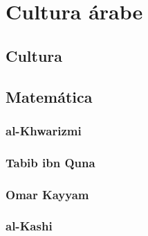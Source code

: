 \documentclass[a4paper,12pt,openany]{article}
\begin{document}
\section*{Cultura árabe}
\subsection*{Cultura}


\subsection*{Matemática}


\subsubsection*{al-Khwarizmi}


\subsubsection*{Tabib ibn Quna}


\subsubsection*{Omar Kayyam}


\subsubsection*{al-Kashi}

\end{document}
